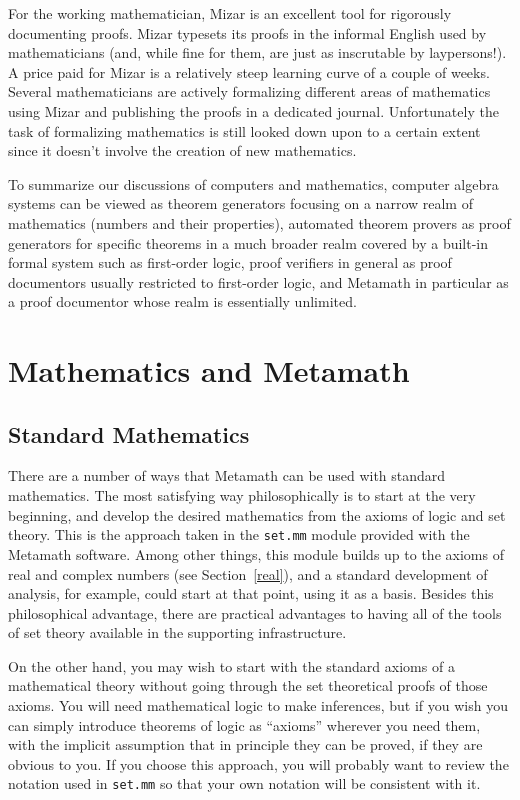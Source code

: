 For the working mathematician, Mizar is an excellent tool for rigorously
documenting proofs. Mizar typesets its proofs in the informal English used by
mathematicians (and, while fine for them, are just as inscrutable by
laypersons!). A price paid for Mizar is a relatively steep learning curve of a
couple of weeks.  Several mathematicians are actively formalizing different
areas of mathematics using Mizar and publishing the proofs in a dedicated
journal. Unfortunately the task of formalizing mathematics is still looked
down upon to a certain extent since it doesn't involve the creation of new
mathematics.

To summarize our discussions of computers and mathematics, computer algebra
systems can be viewed as theorem generators focusing on a narrow realm of
mathematics (numbers and their properties), automated theorem provers as proof
generators for specific theorems in a much broader realm covered by a built-in
formal system such as first-order logic, proof verifiers in general as proof
documentors usually restricted to first-order logic, and Metamath in
particular as a proof documentor whose realm is essentially unlimited.


\section{Mathematics and Metamath}

\subsection{Standard Mathematics}

There are a number of ways that Metamath can be used with
standard mathematics.  The most satisfying way philosophically is to start at
the very beginning, and develop the desired mathematics from the axioms of
logic and set theory.  This is the approach taken in the
\texttt{set.mm} module provided with
the Metamath software.  Among other things, this module builds up to the
axioms of real and complex numbers (see Section~\ref{real}), and a standard development of analysis, for
example, could start at that point, using it as a basis.   Besides this
philosophical advantage, there are practical advantages to having all of the
tools of set theory available in the supporting infrastructure.

On the other hand, you may wish to start with the standard axioms of a
mathematical theory without going through the set theoretical proofs of those
axioms.  You will need mathematical logic to make inferences, but if you wish
you can simply introduce theorems of logic as
``axioms'' wherever you need them, with the implicit assumption
that in principle they can be proved, if they are obvious to you.  If you
choose this approach, you will probably want to review the notation used in
\texttt{set.mm} so that your own
notation will be consistent with it.


